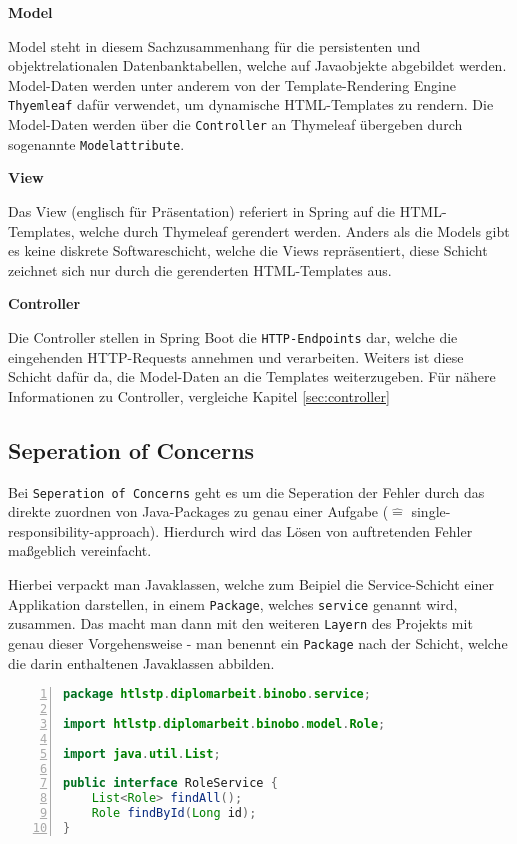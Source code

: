 \documentclass[paper=a4,12pt]{scrreprt}
\begin{document}
\textbf{Model}

Model steht in diesem Sachzusammenhang für die persistenten und objektrelationalen Datenbanktabellen, welche auf Javaobjekte abgebildet werden. Model-Daten werden unter anderem von der Template-Rendering Engine \texttt{Thyemleaf} dafür verwendet, um
dynamische HTML-Templates zu rendern.\newline
Die Model-Daten werden über die \texttt{Controller} an Thymeleaf übergeben durch sogenannte \texttt{Modelattribute}.\newline

\textbf{View}

Das View (englisch für Präsentation) referiert in Spring auf die HTML-Templates, welche durch Thymeleaf gerendert werden. Anders als die Models gibt es keine diskrete Softwareschicht, welche die Views repräsentiert,
diese Schicht zeichnet sich nur durch die gerenderten HTML-Templates aus.\newline

\textbf{Controller}

Die Controller stellen in Spring Boot die \texttt{HTTP-Endpoints} dar, welche die eingehenden HTTP-Requests annehmen und verarbeiten. Weiters ist diese Schicht dafür da, die Model-Daten an die Templates weiterzugeben.
Für nähere Informationen zu Controller, vergleiche Kapitel \ref{sec:controller}

\subsection{Seperation of Concerns}

Bei \texttt{Seperation of Concerns}\cite{soc} geht es um die Seperation der Fehler durch das direkte zuordnen von Java-Packages zu genau einer Aufgabe ($\hat{=}$ single-responsibility-approach). Hierdurch wird das Lösen von
auftretenden Fehler maßgeblich vereinfacht.\newline

Hierbei verpackt man Javaklassen, welche zum Beipiel die Service-Schicht einer Applikation darstellen, in einem \texttt{Package}, welches \texttt{service} genannt wird, zusammen. Das macht man dann mit den weiteren \texttt{Layern} des Projekts mit
genau dieser Vorgehensweise - man benennt ein \texttt{Package} nach der Schicht, welche die darin enthaltenen Javaklassen abbilden.\newline

\begin{lstlisting}[caption={Role-Service Interface}, captionpos=b, label={listing:role_service}, language=java, numbers=left,
  stepnumber=1]
package htlstp.diplomarbeit.binobo.service;

import htlstp.diplomarbeit.binobo.model.Role;

import java.util.List;

public interface RoleService {
    List<Role> findAll();
    Role findById(Long id);
}
\end{lstlisting}
\end{document}

